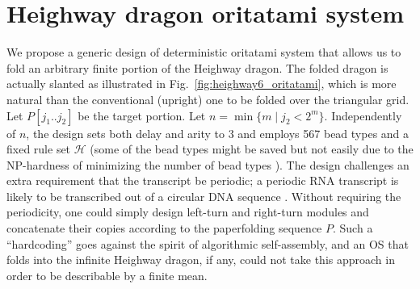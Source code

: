	\section{Heighway dragon oritatami system}



We propose a generic design of deterministic oritatami system that allows us to fold an arbitrary finite portion of the Heighway dragon. 
The folded dragon is actually slanted as illustrated in Fig.~\ref{fig:heighway6_oritatami}, which is more natural than the conventional (upright) one to be folded over the triangular grid. 
Let $P[j_1 .. j_2]$ be the target portion. 
Let $n = \min\{m \mid j_2 < 2^m\}$. 
Independently of $n$, the design sets both delay and arity to 3 and employs 567 bead types and a fixed rule set $\mathcal{H}$ (some of the bead types might be saved but not easily due to the NP-hardness of minimizing the number of bead types \cite{HanKim2017}). 
The design challenges an extra requirement that the transcript be periodic; a periodic RNA transcript is likely to be transcribed out of a circular DNA sequence \cite{GearyAndersen2014}. 
Without requiring the periodicity, one could simply design left-turn and right-turn modules and concatenate their copies according to the paperfolding sequence $P$. 
Such a ``hardcoding'' goes against the spirit of algorithmic self-assembly, and an OS that folds into the infinite Heighway dragon, if any, could not take this approach in order to be describable by a finite mean. 



